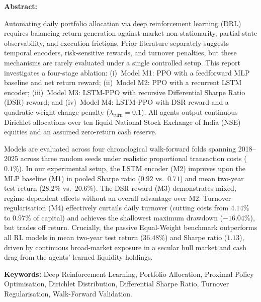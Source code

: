 \documentclass[10pt,a4paper]{report}
\numberwithin{algorithm}{chapter}
\begin{document}
\vspace{0.25cm}
\noindent\textbf{Abstract:}\par
Automating daily portfolio allocation via deep reinforcement learning (DRL) requires balancing return generation against market non-stationarity, partial state observability, and execution frictions. Prior literature separately suggests temporal encoders, risk-sensitive rewards, and turnover penalties, but these mechanisms are rarely evaluated under a single controlled setup. This report investigates a four-stage ablation: (i)~Model M1: PPO with a feedforward MLP baseline and net return reward; (ii)~Model M2: PPO with a recurrent LSTM encoder; (iii)~Model M3: LSTM-PPO with recursive Differential Sharpe Ratio (DSR) reward; and (iv)~Model M4: LSTM-PPO with DSR reward and a quadratic weight-change penalty ($\lambda_{\text{turn}} = 0.1$). All agents output continuous Dirichlet allocations over ten liquid National Stock Exchange of India (NSE) equities and an assumed zero-return cash reserve.

Models are evaluated across four chronological walk-forward folds spanning 2018--2025 across three random seeds under realistic proportional transaction costs ($0.1\%$). In our experimental setup, the LSTM encoder (M2) improves upon the MLP baseline (M1) in pooled Sharpe ratio ($0.92$ vs.\ $0.71$) and mean two-year test return ($28.2\%$ vs.\ $20.6\%$). The DSR reward (M3) demonstrates mixed, regime-dependent effects without an overall advantage over M2. Turnover regularisation (M4) effectively curtails daily turnover (cutting costs from $4.14\%$ to $0.97\%$ of capital) and achieves the shallowest maximum drawdown ($-16.04\%$), but trades off return. Crucially, the passive Equal-Weight benchmark outperforms all RL models in mean two-year test return ($36.48\%$) and Sharpe ratio ($1.13$), driven by continuous broad-market exposure in a secular bull market and cash drag from the agents' learned liquidity holdings.

\medskip\noindent\textbf{Keywords:} Deep Reinforcement Learning, Portfolio Allocation, Proximal Policy Optimisation, Dirichlet Distribution, Differential Sharpe Ratio, Turnover Regularisation, Walk-Forward Validation.

\vspace{0.35cm}
\begin{singlespace}
\setcounter{tocdepth}{0}
\tableofcontents
\end{singlespace}

\newpage
{}
\setcounter{page}{1}







\clearpage



\par\vspace{10pt}


\end{document}
